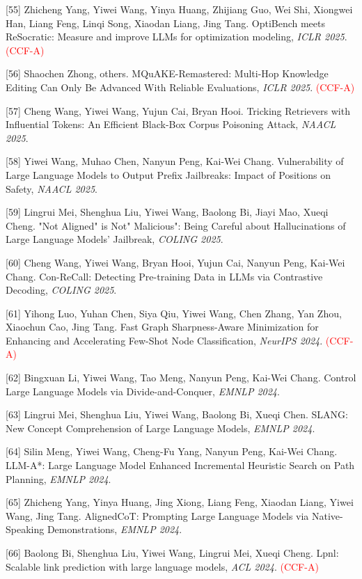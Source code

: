 [55] Zhicheng Yang, Yiwei Wang, Yinya Huang, Zhijiang Guo, Wei Shi, Xiongwei Han, Liang Feng, Linqi Song, Xiaodan Liang, Jing Tang. OptiBench meets ReSocratic: Measure and improve LLMs for optimization modeling, \textit{ICLR 2025}. \textcolor{red}{(CCF-A)}

[56] Shaochen Zhong, others. MQuAKE-Remastered: Multi-Hop Knowledge Editing Can Only Be Advanced With Reliable Evaluations, \textit{ICLR 2025}. \textcolor{red}{(CCF-A)}

[57] Cheng Wang, Yiwei Wang, Yujun Cai, Bryan Hooi. Tricking Retrievers with Influential Tokens: An Efficient Black-Box Corpus Poisoning Attack, \textit{NAACL 2025}.

[58] Yiwei Wang, Muhao Chen, Nanyun Peng, Kai-Wei Chang. Vulnerability of Large Language Models to Output Prefix Jailbreaks: Impact of Positions on Safety, \textit{NAACL 2025}.

[59] Lingrui Mei, Shenghua Liu, Yiwei Wang, Baolong Bi, Jiayi Mao, Xueqi Cheng. "Not Aligned" is Not" Malicious": Being Careful about Hallucinations of Large Language Models' Jailbreak, \textit{COLING 2025}.

[60] Cheng Wang, Yiwei Wang, Bryan Hooi, Yujun Cai, Nanyun Peng, Kai-Wei Chang. Con-ReCall: Detecting Pre-training Data in LLMs via Contrastive Decoding, \textit{COLING 2025}.

[61] Yihong Luo, Yuhan Chen, Siya Qiu, Yiwei Wang, Chen Zhang, Yan Zhou, Xiaochun Cao, Jing Tang. Fast Graph Sharpness-Aware Minimization for Enhancing and Accelerating Few-Shot Node Classification, \textit{NeurIPS 2024}. \textcolor{red}{(CCF-A)}

[62] Bingxuan Li, Yiwei Wang, Tao Meng, Nanyun Peng, Kai-Wei Chang. Control Large Language Models via Divide-and-Conquer, \textit{EMNLP 2024}.

[63] Lingrui Mei, Shenghua Liu, Yiwei Wang, Baolong Bi, Xueqi Chen. SLANG: New Concept Comprehension of Large Language Models, \textit{EMNLP 2024}.

[64] Silin Meng, Yiwei Wang, Cheng-Fu Yang, Nanyun Peng, Kai-Wei Chang. LLM-A*: Large Language Model Enhanced Incremental Heuristic Search on Path Planning, \textit{EMNLP 2024}.

[65] Zhicheng Yang, Yinya Huang, Jing Xiong, Liang Feng, Xiaodan Liang, Yiwei Wang, Jing Tang. AlignedCoT: Prompting Large Language Models via Native-Speaking Demonstrations, \textit{EMNLP 2024}.

[66] Baolong Bi, Shenghua Liu, Yiwei Wang, Lingrui Mei, Xueqi Cheng. Lpnl: Scalable link prediction with large language models, \textit{ACL 2024}. \textcolor{red}{(CCF-A)}

